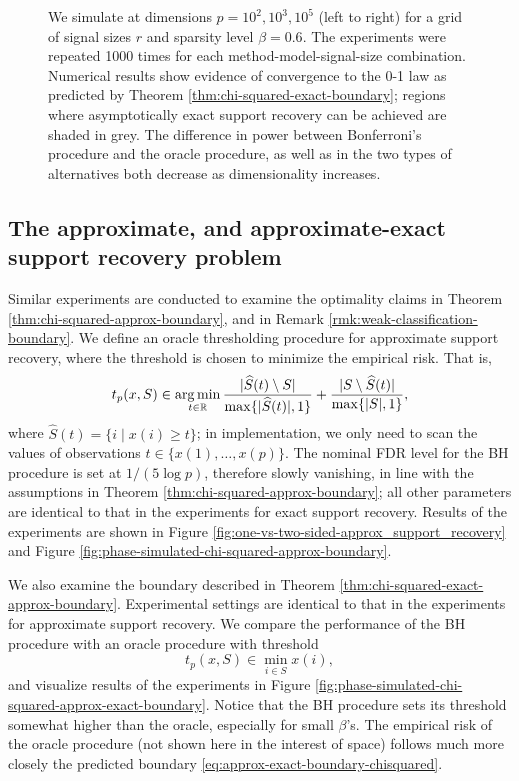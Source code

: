 \begin{figure}
{      We simulate at dimensions $p=10^2, 10^3, 10^5$ (left to right) for a grid of signal sizes $r$ and sparsity level $\beta=0.6$.
      The experiments were repeated 1000 times for each method-model-signal-size combination. 
      Numerical results show evidence of convergence to the 0-1 law as predicted by Theorem \ref{thm:chi-squared-exact-boundary}; regions where asymptotically exact support recovery can be achieved are shaded in grey.
      The difference in power between Bonferroni's procedure and the oracle procedure, as well as in the two types of alternatives both decrease as dimensionality increases.} 
      \label{fig:one-vs-two-sided-exact_support_recovery}
\end{figure}

\subsection{The approximate, and approximate-exact support recovery problem}

Similar experiments are conducted to examine the optimality claims in Theorem \ref{thm:chi-squared-approx-boundary}, and in Remark \ref{rmk:weak-classification-boundary}.
We define an oracle thresholding procedure for approximate support recovery, where the threshold is chosen to minimize the empirical risk.
That is,
$$
t_p(x, S) \in \operatorname*{arg\,min}_{t\in\mathbb R} \frac{|\widehat{S}(t)\setminus S|}{\max\{|\widehat{S}(t)|,1\}} + \frac{|S\setminus \widehat{S}(t)|}{\max\{|{S}|,1\}},
$$
where $\widehat{S}(t) = \{i\;|\;x(i)\ge t\}$;
in implementation, we only need to scan the values of observations $t\in\{x(1), \ldots, x(p)\}$. 
The nominal FDR level for the BH procedure is set at $1/(5{\log{p}})$, therefore slowly vanishing, in line with the assumptions in Theorem \ref{thm:chi-squared-approx-boundary}; all other parameters are identical to that in the experiments for exact support recovery.
Results of the experiments are shown in Figure \ref{fig:one-vs-two-sided-approx_support_recovery} and Figure \ref{fig:phase-simulated-chi-squared-approx-boundary}.

We also examine the boundary described in Theorem \ref{thm:chi-squared-exact-approx-boundary}.
Experimental settings are identical to that in the experiments for approximate support recovery.
We compare the performance of the BH procedure with an oracle procedure with threshold
$$
t_p(x, S) \in \min_{i\in S} x(i),
$$
and visualize results of the experiments in Figure \ref{fig:phase-simulated-chi-squared-approx-exact-boundary}.
Notice that the BH procedure sets its threshold somewhat higher than the oracle, especially for small $\beta$'s. 
The empirical risk of the oracle procedure (not shown here in the interest of space) follows much more closely the predicted boundary \eqref{eq:approx-exact-boundary-chisquared}.

